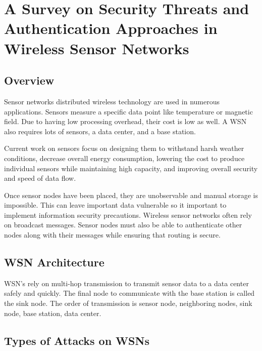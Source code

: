 \section {A Survey on Security Threats and Authentication Approaches in Wireless Sensor Networks}
\subsection {Overview}
\smallskip

Sensor networks distributed wireless technology are used in numerous applications. Sensors measure a specific data point like temperature or magnetic field. Due to having low processing overhead, their cost is low as well. A WSN also requires lots of sensors, a data center, and a base station.

\smallskip

Current work on sensors focus on designing them to withstand harsh weather conditions, decrease overall energy consumption, lowering the cost to produce individual sensors while maintaining high capacity, and improving overall security and speed of data flow.

\smallskip

Once sensor nodes have been placed, they are unobservable and manual storage is impossible. This can leave important data vulnerable so it important to implement information security precautions. Wireless sensor networks often rely on broadcast messages. Sensor nodes must also be able to authenticate other nodes along with their messages while ensuring that routing is secure. 

\subsection {WSN Architecture}
\smallskip

WSN’s rely on multi-hop transmission to transmit sensor data to a data center safely and quickly. The final node to communicate with the base station is called the sink node. The order of transmission is sensor node, neighboring nodes, sink node, base station, data center.

\subsection {Types of Attacks on WSNs}
\smallskip

